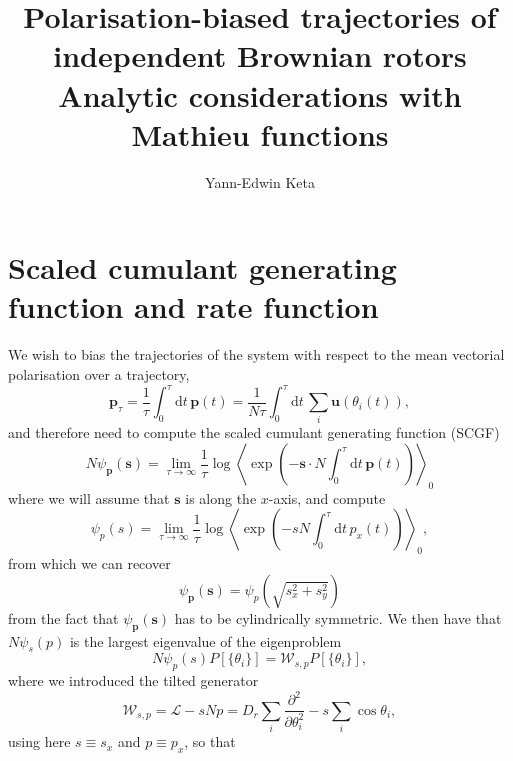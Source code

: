 \documentclass[pre,aps,superscriptaddress,nofootinbib]{revtex4}
\begin{document}
\title{Polarisation-biased trajectories of independent Brownian rotors\\{\small Analytic considerations with Mathieu functions}}

\author{Yann-Edwin Keta}
\maketitle

\section{Scaled cumulant generating function and rate function}

We wish to bias the trajectories of the system with respect to the mean vectorial polarisation over a trajectory,
\begin{equation}
\bm{p}_{\tau} = \frac{1}{\tau} \int_0^{\tau} \text{d}t \, \bm{p}(t) = \frac{1}{N \tau} \int_0^{\tau} \text{d}t \, \sum_i \bm{u}(\theta_i(t)),
\end{equation}
and therefore need to compute the scaled cumulant generating function (SCGF)
\begin{equation}
N \psi_{\bm{p}}(\bm{s}) = \lim_{\tau \rightarrow \infty} \frac{1}{\tau} \log\left<\exp\left(- \bm{s} \cdot N \int_0^{\tau} \text{d}t \, \bm{p}(t)\right)\right>_0
\end{equation}
where we will assume that $\bm{s}$ is along the $x$-axis, and compute
\begin{equation}
\psi_ {p}(s) = \lim_{\tau \rightarrow \infty} \frac{1}{\tau} \log\left<\exp\left(- s N \int_0^{\tau} \text{d}t \, p_x(t)\right)\right>_0,
\end{equation}
from which we can recover
\begin{equation}
\psi_{\bm{p}}(\bm{s}) = \psi_{p}\left(\sqrt{s_x^2 + s_y^2}\right)
\end{equation}
from the fact that $\psi_{\bm{p}}(\bm{s})$ has to be cylindrically symmetric. We then have that $N \psi_s(p)$ is the largest eigenvalue of the eigenproblem
\begin{equation}
N \psi_{p}(s) P[\{\theta_i\}] = \mathscr{W}_{s, p} P[\{\theta_i\}],
\end{equation}
where we introduced the tilted generator \cite{touchette2018introduction}
\begin{equation}
\mathscr{W}_{s, p} = \mathcal{L} - s N p = D_r \sum_i \frac{\partial^2}{\partial \theta_i^2} - s \sum_i \cos\theta_i,
\end{equation}
using here $s \equiv s_x$ and $p \equiv p_x$, so that
\end{document}
